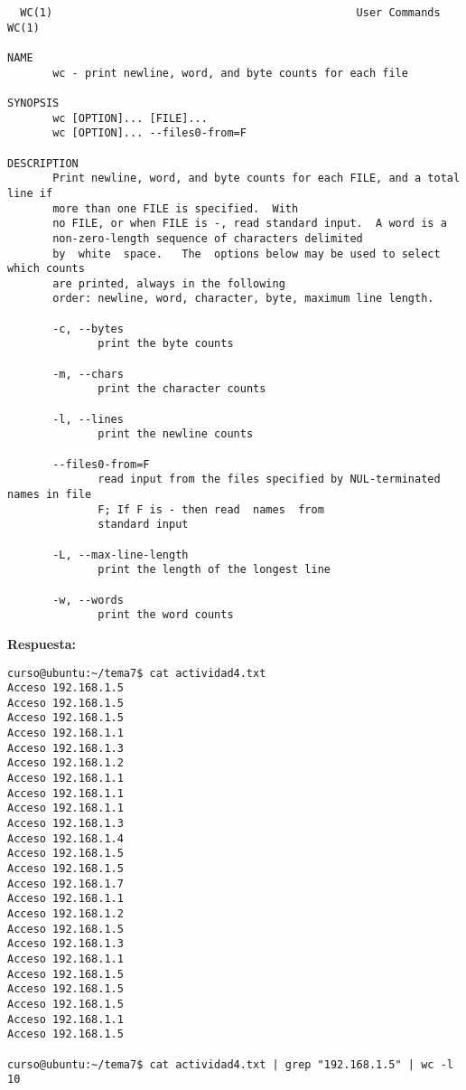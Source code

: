 \documentclass[a4paper,11pt,spanish]{article} %
\newenvironment{myscriptlisting}
{\begin{list}{}{\setlength{\leftmargin}{1em}}\item\scriptsize\bfseries}
{\end{list}}
\begin{document}
\begin{myscriptlisting}
 \begin{verbatim}
  WC(1)                                               User Commands                                               WC(1)

NAME
       wc - print newline, word, and byte counts for each file

SYNOPSIS
       wc [OPTION]... [FILE]...
       wc [OPTION]... --files0-from=F

DESCRIPTION
       Print newline, word, and byte counts for each FILE, and a total line if
       more than one FILE is specified.  With
       no FILE, or when FILE is -, read standard input.  A word is a
       non-zero-length sequence of characters delimited
       by  white  space.   The  options below may be used to select which counts
       are printed, always in the following
       order: newline, word, character, byte, maximum line length.

       -c, --bytes
              print the byte counts

       -m, --chars
              print the character counts

       -l, --lines
              print the newline counts

       --files0-from=F
              read input from the files specified by NUL-terminated names in file
              F; If F is - then read  names  from
              standard input

       -L, --max-line-length
              print the length of the longest line

       -w, --words
              print the word counts
 \end{verbatim}
\end{myscriptlisting}

\textbf{Respuesta:}

\begin{myscriptlisting}
 \begin{verbatim}
curso@ubuntu:~/tema7$ cat actividad4.txt 
Acceso 192.168.1.5
Acceso 192.168.1.5
Acceso 192.168.1.5
Acceso 192.168.1.1
Acceso 192.168.1.3
Acceso 192.168.1.2
Acceso 192.168.1.1
Acceso 192.168.1.1
Acceso 192.168.1.1
Acceso 192.168.1.3
Acceso 192.168.1.4
Acceso 192.168.1.5
Acceso 192.168.1.5
Acceso 192.168.1.7
Acceso 192.168.1.1
Acceso 192.168.1.2
Acceso 192.168.1.5
Acceso 192.168.1.3
Acceso 192.168.1.1
Acceso 192.168.1.5
Acceso 192.168.1.5
Acceso 192.168.1.5
Acceso 192.168.1.1
Acceso 192.168.1.5

curso@ubuntu:~/tema7$ cat actividad4.txt | grep "192.168.1.5" | wc -l
10
 \end{verbatim}
\end{myscriptlisting}
\end{document}
